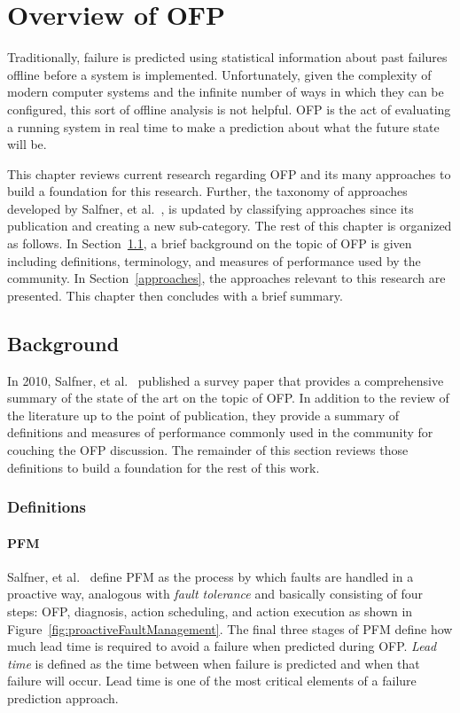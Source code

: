\chapter{Overview of \ac{OFP}} \label{chapter2}
Traditionally, failure is predicted using statistical information about past
failures offline before a system is implemented.  Unfortunately, given the
complexity of modern computer systems and the infinite number of ways in which
they can be configured, this sort of offline analysis is not helpful.  \ac{OFP}
is the act of evaluating a running system in real time to make a prediction
about what the future state will be.

This chapter reviews current research regarding \ac{OFP} and its many
approaches to build a foundation for this research.  Further, the taxonomy of
approaches developed by Salfner, et al.~\cite{salfnerSurvey}, is updated by
classifying approaches since its publication and creating a new sub-category.
The rest of this chapter is organized as follows.  In Section~\ref{background},
a brief background on the topic of \ac{OFP} is given including definitions,
terminology, and measures of performance used by the community.  In
Section~\ref{approaches}, the approaches relevant to this research are
presented.  This chapter then concludes with a brief summary.

\section{Background} \label{background}
In 2010, Salfner, et al.~\cite{salfnerSurvey} published a survey paper that
provides a comprehensive summary of the state of the art on the topic of
\ac{OFP}.  In addition to the review of the literature up to the point of
publication, they provide a summary of definitions and measures of performance
commonly used in the community for couching the \ac{OFP} discussion.  The
remainder of this section reviews those definitions to build a foundation for
the rest of this work.

\subsection{Definitions} \label{definitions}
\subsubsection{\ac{PFM}} \label{pfm}
Salfner, et al.~\cite{salfnerSurvey} define \ac{PFM} as the process by which
faults are handled in a proactive way, analogous with \emph{fault tolerance}
and basically consisting of four steps: \ac{OFP}, diagnosis, action scheduling,
and action execution as shown in Figure~\ref{fig:proactiveFaultManagement}.
The final three stages of \ac{PFM} define how much lead time is required to
avoid a failure when predicted during \ac{OFP}.  \emph{Lead time} is defined as
the time between when failure is predicted and when that failure will occur.
Lead time is one of the most critical elements of a failure prediction
approach.

